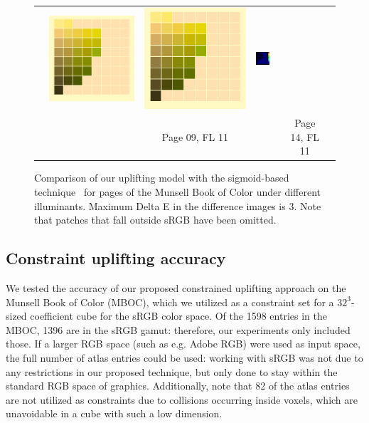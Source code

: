 \begin{figure}[ht!]
{\begin{tabular}{ccccccc}
			&\quad
			\includegraphics[width=.15\linewidth]{img/results_uplift_page14_originalFL11.png}
			&
			\includegraphics[width=.15\linewidth]{img/results_uplift_page14_ourFL11.png}
			&
			\includegraphics[width=.15\linewidth,height=5.25em]{img/results_uplift_page14_diff_ourFL11.png}\\
			& & Page 09, FL 11 & & & Page 14, FL 11 & \\
		\end{tabular}
	}
	\caption{Comparison of our uplifting model with the sigmoid-based technique~\cite{upsamplingJakobHanika} for pages of the Munsell Book of Color under different illuminants. Maximum Delta E in the difference images is 3. Note that patches that fall outside sRGB have been omitted.}
	\label{fig:results_uplift_munsell}
\end{figure}

\subsection{Constraint uplifting accuracy}

We tested the accuracy of our proposed constrained uplifting approach on the Munsell Book of Color (MBOC), which we utilized as a constraint set for a $32^3$-sized coefficient cube for the sRGB color space. Of the 1598 entries in the MBOC, 1396 are in the sRGB gamut: therefore, our experiments only included those. If a larger RGB space (such as e.g. Adobe RGB) were used as input space, the full number of atlas entries could be used: working with sRGB was not due to any restrictions in our proposed technique, but only done to stay within the standard RGB space of graphics. Additionally, note that 82 of the atlas entries are not utilized as constraints due to collisions occurring inside voxels, which are unavoidable in a cube with such a low dimension.

